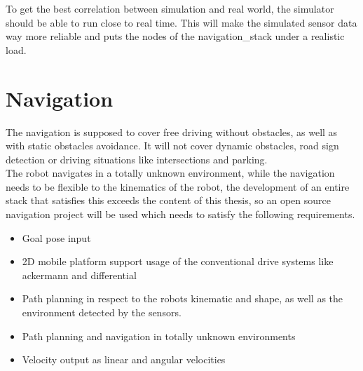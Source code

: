 To get the best correlation between simulation and real world, the simulator should be able to run close to real time. This will make the simulated sensor data way more reliable and puts the nodes of the navigation\_stack under a realistic load.

\section{Navigation}
The navigation is supposed to cover free driving without obstacles, as well as with static obstacles avoidance. It will not cover dynamic obstacles, road sign detection or driving situations like intersections and parking.\\


The robot navigates in a totally unknown environment, while the navigation needs to be flexible to the kinematics of the robot, the development of an entire stack that satisfies this exceeds the content of this thesis, so an open source navigation project will be used which needs to satisfy the following requirements. 

\begin{itemize}
	\item Goal pose input
	\item 2D mobile platform support usage of the conventional drive systems like ackermann and differential
	\item Path planning in respect to the robots kinematic and shape, as well as the environment detected by the sensors.
	\item Path planning and navigation in totally unknown environments
	\item Velocity output as linear and angular velocities
\end{itemize}













